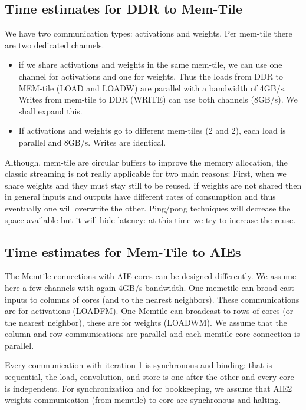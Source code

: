 \documentclass[conference]{IEEEtran}
\begin{document}
\subsection{Time estimates for DDR to Mem-Tile}
We have two communication types: activations and weights. Per
mem-tile there are two dedicated channels.
\begin{itemize}
 \item if we share activations and weights in the same mem-tile, we
   can use one channel for activations and one for weights. Thus the
   loads from DDR to MEM-tile (LOAD and LOADW) are parallel with a
   bandwidth of 4GB/s. Writes from mem-tile to DDR (WRITE) can use
   both channels (8GB/s). We shall expand this.

 \item If activations and weights go to different mem-tiles (2 and 2),
   each load is parallel and 8GB/s. Writes
   are identical.
\end{itemize}
Although, mem-tile are circular buffers to improve the memory
allocation, the classic streaming is not really applicable for two
main reasons: First, when we share weights and they must stay still to
be reused, if weights are not shared then in general inputs and
outputs have different rates of consumption and thus eventually one
will overwrite the other. Ping/pong techniques will decrease the space
available but it will hide latency: at this time we try to increase
the reuse.
   
\subsection{Time estimates for Mem-Tile to AIEs}

The Memtile connections with AIE cores can be designed differently. We
assume here a few channels with again 4GB/s bandwidth. One memetile
can broad cast inputs to columns of cores (and to the nearest
neighbors). These communications are for activations (LOADFM). One
Memtile can broadcast to rows of cores (or the nearest neighbor),
these are for weights (LOADWM). We assume that the column and row
communications are parallel and each memtile core connection is
parallel.

Every communication with iteration 1 is synchronous and binding: that
is sequential, the load, convolution, and store is one after the other
and every core is independent.  For synchronization and for
bookkeeping, we assume that AIE2 weights communication (from memtile)
to core are synchronous and halting.
\end{document}
